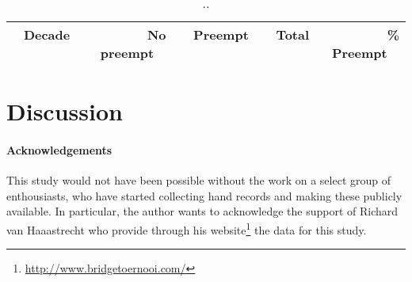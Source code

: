 \documentclass{llncs}
\begin{document}
\begin{table}
\caption{..}
\centering
\begin{tabular}{|c|r|r|r|r|}
\hline
\bf \ Decade \ & \bf \ No preempt \ & \bf \ Preempt \ & \bf \ Total \  & 
\bf \ \% Preempt \ \\ \hline
\end{tabular}
\end{table}



\section{Discussion}
\label{sec:discussion}

\paragraph{Acknowledgements}
This study would not have been possible without the work on a select
group of enthousiasts, who have started collecting hand records and
making these publicly available. In particular, the author wants to
acknowledge the support of Richard van Haaastrecht who provide through
his website\footnote{\url{http://www.bridgetoernooi.com/}} the data
for this study.  



\end{document}
